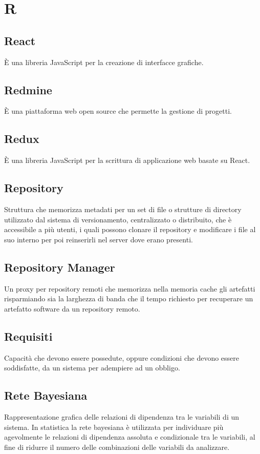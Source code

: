 \section*{R}

\subsection{React}
È una libreria JavaScript per la creazione di interfacce grafiche.

\subsection{Redmine}
È una piattaforma web open source che permette la gestione di progetti.

\subsection{Redux}
È una libreria JavaScript per la scrittura di applicazione web basate su React.

\subsection{Repository}
Struttura che memorizza metadati per un set di file o strutture di directory utilizzato dal sistema di versionamento, centralizzato o distribuito, che è accessibile a più utenti, i quali possono clonare il repository e modificare i file al suo interno per poi reinserirli nel server dove erano presenti.

\subsection{Repository Manager}
Un proxy per repository remoti che memorizza nella memoria cache gli artefatti risparmiando sia la larghezza di banda che il tempo richiesto per recuperare un artefatto software da un repository remoto.

\subsection{Requisiti}
Capacità che devono essere possedute, oppure condizioni che devono essere soddisfatte, da un sistema per adempiere ad un obbligo.

\subsection{Rete Bayesiana}
Rappresentazione grafica delle relazioni di dipendenza tra le variabili di un sistema. In statistica la rete bayesiana è utilizzata per individuare più agevolmente le relazioni di dipendenza assoluta e condizionale tra le variabili, al fine di ridurre il numero delle combinazioni delle variabili da analizzare.